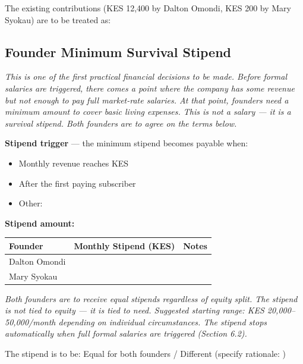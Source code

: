 \documentclass[12pt,a4paper]{article}
\newcommand{\blank}[1][5.5cm]{\underline{\hspace{#1}}}
\newcommand{\cb}{$\square$\;}                   %
\begin{document}
\noindent The existing contributions (KES 12{,}400 by Dalton Omondi, KES 200 by Mary Syokau) are to be treated as: \blank[6cm]

\subsection{Founder Minimum Survival Stipend}

\begin{notebox}
\textit{This is one of the first practical financial decisions to be made. Before formal salaries are triggered, there comes a point where the company has some revenue but not enough to pay full market-rate salaries. At that point, founders need a minimum amount to cover basic living expenses. This is not a salary --- it is a survival stipend. Both founders are to agree on the terms below.}
\end{notebox}

\noindent\textbf{Stipend trigger} --- the minimum stipend becomes payable when:

\begin{itemize}[label=\cb]
  \item Monthly revenue reaches KES \blank[3.5cm]
  \item After the first paying subscriber
  \item Other: \blank[6cm]
\end{itemize}

\noindent\textbf{Stipend amount:}

\begin{tabularx}{\linewidth}{L{4cm} X X}
  \toprule
  \textbf{Founder} & \textbf{Monthly Stipend (KES)} & \textbf{Notes} \\
  \midrule
  Dalton Omondi & \blank[4cm] & \\[0.4em]
  Mary Syokau   & \blank[4cm] & \\
  \bottomrule
\end{tabularx}

\begin{notebox}
\textit{Both founders are to receive equal stipends regardless of equity split. The stipend is not tied to equity --- it is tied to need. Suggested starting range: KES 20{,}000--50{,}000/month depending on individual circumstances. The stipend stops automatically when full formal salaries are triggered (Section 6.2).}
\end{notebox}

\noindent The stipend is to be: \quad Equal for both founders \;/\; Different (specify rationale: \blank[4cm])
\end{document}
